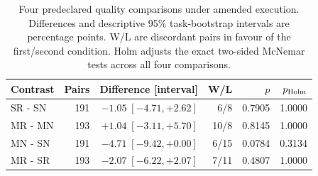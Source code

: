 \begin{table}[htbp]\centering\small
\caption{Four predeclared quality comparisons under amended execution. Differences and descriptive 95\% task-bootstrap intervals are percentage points. W/L are discordant pairs in favour of the first/second condition. Holm adjusts the exact two-sided McNemar tests across all four comparisons.}\label{tab:heldout-tests}
\begin{tabular}{lrrrrr}\toprule
Contrast & Pairs & Difference [interval] & W/L & $p$ & $p_{\rm Holm}$\\
\midrule
SR - SN & 191 & $-1.05\;[-4.71,+2.62]$ & 6/8 & 0.7905 & 1.0000\\
MR - MN & 193 & $+1.04\;[-3.11,+5.70]$ & 10/8 & 0.8145 & 1.0000\\
MN - SN & 191 & $-4.71\;[-9.42,+0.00]$ & 6/15 & 0.0784 & 0.3134\\
MR - SR & 193 & $-2.07\;[-6.22,+2.07]$ & 7/11 & 0.4807 & 1.0000\\
\bottomrule\end{tabular}\end{table}
